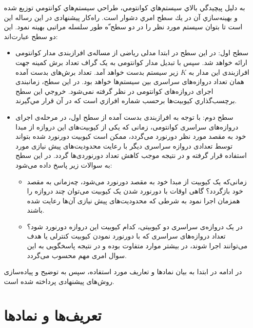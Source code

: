 به دليل پيچيدگي بالاي سيستم‌هاي كوانتومي، طراحي سيستم‌هاي كوانتومي توزيع شده و بهينه‌سازي آن در يك سطح امري دشوار است. راه‌کار پیشنهادی در این رساله این است تا بتوان سیستم مورد نظر را در دو سطح ّه طور سلسله مراتبی بهینه نمود. این دو سطح عبارت‌اند:
\begin{itemize}
\item

 سطح اول: در این سطح در ابتدا مدلی ریاضی از  مساله‌ی افرازبندی مدار کوانتومی ارائه خواهد شد. سپس با تبدیل مدار کوانتومی به یک گراف تعداد برش کمینه جهت افرازبندی این مدار به $K$ زیر سیستم بدست خواهد آمد. تعداد برش‌های بدست آمده همان تعداد دروازه‌های سراسری بین سیستم‌ها خواهد بود. در این سطح، زمانبندی اجرای دروازه‌های کوانتومی در نظر گرفته نمی‌شود. خروجي اين سطح برچسب‌گذاري كيوبيت‌ها برحسب شماره افرازي است كه در آن قرار مي‌گيرند.


\item
 سطح دوم: با توجه به افرازبندی بدست آمده از سطح اول، در مرحله‌ی اجرای دروازه‌های سراسری کوانتومی، زمانی که یکی از کیوبیت‌های این دروازه از مبدا خود به مقصد مورد نظر دورنورد می‌گردد، ممکن است کیوبیت دورنورد شده بتواند توسط تعدادی دروازه سراسری دیگر با رعایت محدودیت‌های پیش نیازی مورد استفاده قرار گرفته و در نتیجه موجب کاهش تعداد دورنوردی‌ها گردد. در این سطح به سوالات زیر پاسخ داده می‌شود: 
\begin{itemize}
\item
زمانی‌که یک کیوبیت از مبدا خود به مقصد دورنورد می‌شود، چه‌زمانی به مقصد خود بازگردد؟ گاهی اوقات با دورنورد شدن یک کیوبیت می‌توان چند دروازه را همزمان اجرا نمود به شرطی که محدودیت‌های پیش نیازی آن‌ها رعایت شده باشند.
\item
در یک دروازه‌ی سراسری دو کیوبیتی، کدام کیوبیت این دروازه دورنورد شود؟  تعداد دروازه‌های سراسری که با دورنورد نمودن کیوبیت کنترلی یا هدف می‌توانند اجرا شوند، در بیشتر موارد متفاوت بوده و در نتیجه پاسخگویی به این سوال امری مهم محسوب می‌گردد.
\end{itemize}
\end{itemize}
در ادامه در ابتدا به بیان نمادها و تعاریف مورد استفاده، سپس به توضیح و پیاده‌سازی روش‌های پیشنهادی پرداخته شده است.

\section{تعریف‌ها و نمادها}
